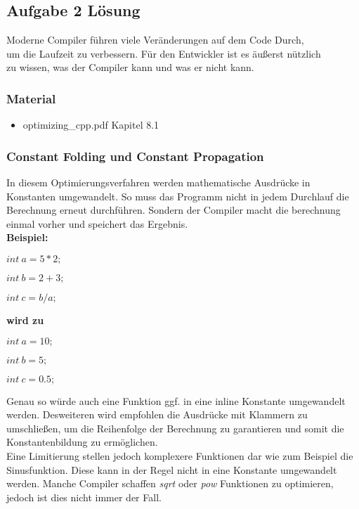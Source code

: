 \documentclass{article}
\begin{document}
\newpage

\subsection{Aufgabe 2 Lösung}
Moderne Compiler führen viele Veränderungen auf dem Code Durch, \\
um die Laufzeit zu verbessern. Für den Entwickler ist es äußerst nützlich \\
zu wissen, was der Compiler kann und was er nicht kann.
\subsubsection{Material}
\begin{itemize}
  \item optimizing\_cpp.pdf Kapitel 8.1
\end{itemize} 

\subsubsection{Constant Folding und Constant Propagation}
In diesem Optimierungsverfahren werden mathematische Ausdrücke in Konstanten umgewandelt. So muss das Programm nicht in jedem Durchlauf die Berechnung erneut durchführen. Sondern der Compiler macht die berechnung einmal vorher und speichert das Ergebnis. \\
\textbf{Beispiel:}

\begin{math}
int\ a = 5 * 2;
\end{math}

\begin{math}
int\ b = 2+3;
\end{math}

\begin{math}
int\ c = b / a;
\end{math}

\textbf{wird zu} 

\begin{math}
int\ a = 10;
\end{math}

\begin{math}
int\ b = 5;
\end{math}

\begin{math}
int\ c = 0.5;
\end{math}

Genau so würde auch eine Funktion ggf. in eine inline Konstante umgewandelt werden. Desweiteren wird empfohlen die Ausdrücke mit Klammern zu umschließen, um die Reihenfolge der Berechnung zu garantieren und somit die Konstantenbildung zu ermöglichen. \\
Eine Limitierung stellen jedoch komplexere Funktionen dar wie zum Beispiel die Sinusfunktion. Diese kann in der Regel nicht in eine Konstante umgewandelt werden. Manche Compiler schaffen \emph{sqrt} oder \emph{pow} Funktionen zu optimieren, jedoch ist dies nicht immer der Fall. 
\end{document}
